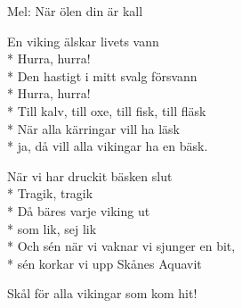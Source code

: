 \begin{SongText}[Vikingen]
    \begin{SongInfo}
        Mel: När ölen din är kall
    \end{SongInfo}
    \begin{SongVerse}
        En viking älskar livets vann\\*%
        Hurra, hurra!\\*%
        Den hastigt i mitt svalg försvann\\*%
        Hurra, hurra!\\*%
        Till kalv, till oxe, till fisk, till fläsk\\*%
        När alla kärringar vill ha läsk\\*%
        ja, då vill alla vikingar ha en bäsk.
    \end{SongVerse}
    \begin{SongVerse}
        När vi har druckit bäsken slut\\*%
        Tragik, tragik\\*%
        Då bäres varje viking ut\\*%
        som lik, sej lik\\*%
        Och sén när vi vaknar vi sjunger en bit,\\*%
        sén korkar vi upp Skånes Aquavit
    \end{SongVerse}
    \begin{SongVerse}
        Skål för alla vikingar som kom hit!
    \end{SongVerse}
\end{SongText}
